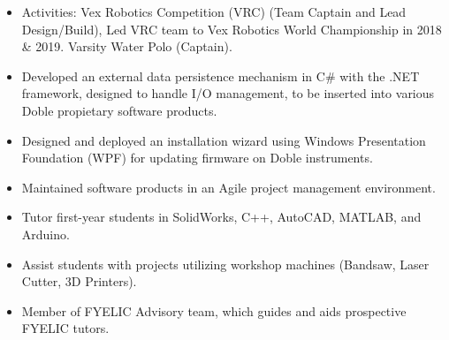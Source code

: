 \documentclass[10pt,a4paper,ragged2e,withhyper]{altacv}
\begin{document}
\begin{paracol}{2}
    \begin{itemize}
        \item Activities: Vex Robotics Competition (VRC) (Team Captain and Lead Design/Build), Led VRC team to Vex Robotics World Championship in 2018 \& 2019. Varsity Water Polo (Captain).
    \end{itemize}
    \vspace{-1.5em} %
    \begin{itemize}
        \item Developed an external data persistence mechanism in C\# with the .NET framework, designed to handle I/O management, to be inserted into various Doble propietary software products.
        \item Designed and deployed an installation wizard using Windows Presentation Foundation (WPF) for updating firmware on Doble instruments.
        \item Maintained software products in an Agile project management environment.
    \end{itemize}

    \begin{itemize}
        \item Tutor first-year students in SolidWorks, C++, AutoCAD, MATLAB, and Arduino.
        \item Assist students with projects utilizing workshop machines (Bandsaw, Laser Cutter, 3D Printers).
        \item Member of FYELIC Advisory team, which guides and aids prospective FYELIC tutors.
    \end{itemize}


\end{paracol}
\end{document}
